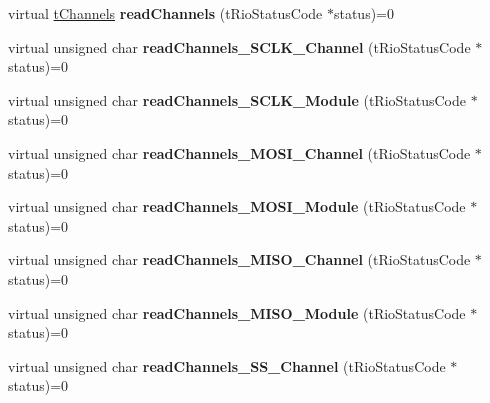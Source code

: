 \begin{DoxyCompactItemize}
\item 
\hypertarget{classnFPGA_1_1nFRC__2012__1__6__4_1_1tSPI_a83380635709415b225a82f2938d31d15}{
virtual \hyperlink{unionnFPGA_1_1nFRC__2012__1__6__4_1_1tSPI_1_1tChannels}{tChannels} {\bfseries readChannels} (tRioStatusCode $\ast$status)=0}
\label{classnFPGA_1_1nFRC__2012__1__6__4_1_1tSPI_a83380635709415b225a82f2938d31d15}

\item 
\hypertarget{classnFPGA_1_1nFRC__2012__1__6__4_1_1tSPI_a1e9616a215d7d41ca0de91dca03b5b41}{
virtual unsigned char {\bfseries readChannels\_\-SCLK\_\-Channel} (tRioStatusCode $\ast$status)=0}
\label{classnFPGA_1_1nFRC__2012__1__6__4_1_1tSPI_a1e9616a215d7d41ca0de91dca03b5b41}

\item 
\hypertarget{classnFPGA_1_1nFRC__2012__1__6__4_1_1tSPI_a3d60ef4b3b385f141c8cda7885faa0c8}{
virtual unsigned char {\bfseries readChannels\_\-SCLK\_\-Module} (tRioStatusCode $\ast$status)=0}
\label{classnFPGA_1_1nFRC__2012__1__6__4_1_1tSPI_a3d60ef4b3b385f141c8cda7885faa0c8}

\item 
\hypertarget{classnFPGA_1_1nFRC__2012__1__6__4_1_1tSPI_ac35b36a7b4f2bbff55900e1704cdb2c8}{
virtual unsigned char {\bfseries readChannels\_\-MOSI\_\-Channel} (tRioStatusCode $\ast$status)=0}
\label{classnFPGA_1_1nFRC__2012__1__6__4_1_1tSPI_ac35b36a7b4f2bbff55900e1704cdb2c8}

\item 
\hypertarget{classnFPGA_1_1nFRC__2012__1__6__4_1_1tSPI_a17b686953a9839a88ff0ea1408c3c70f}{
virtual unsigned char {\bfseries readChannels\_\-MOSI\_\-Module} (tRioStatusCode $\ast$status)=0}
\label{classnFPGA_1_1nFRC__2012__1__6__4_1_1tSPI_a17b686953a9839a88ff0ea1408c3c70f}

\item 
\hypertarget{classnFPGA_1_1nFRC__2012__1__6__4_1_1tSPI_a6f22b95d13cf4565528abbf314f38854}{
virtual unsigned char {\bfseries readChannels\_\-MISO\_\-Channel} (tRioStatusCode $\ast$status)=0}
\label{classnFPGA_1_1nFRC__2012__1__6__4_1_1tSPI_a6f22b95d13cf4565528abbf314f38854}

\item 
\hypertarget{classnFPGA_1_1nFRC__2012__1__6__4_1_1tSPI_a6432d54698afccd131442b8f8a214ddd}{
virtual unsigned char {\bfseries readChannels\_\-MISO\_\-Module} (tRioStatusCode $\ast$status)=0}
\label{classnFPGA_1_1nFRC__2012__1__6__4_1_1tSPI_a6432d54698afccd131442b8f8a214ddd}

\item 
\hypertarget{classnFPGA_1_1nFRC__2012__1__6__4_1_1tSPI_a14ec0a2e4dcb65c1a6c6ed2d32af62a9}{
virtual unsigned char {\bfseries readChannels\_\-SS\_\-Channel} (tRioStatusCode $\ast$status)=0}
\label{classnFPGA_1_1nFRC__2012__1__6__4_1_1tSPI_a14ec0a2e4dcb65c1a6c6ed2d32af62a9}


\end{DoxyCompactItemize}
